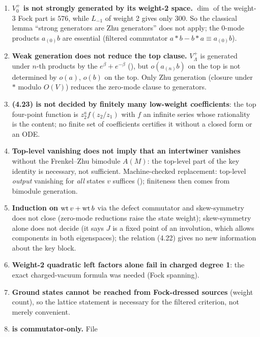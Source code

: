 \begin{enumerate}
  $\varphi$, or everything), and excluding the second case needs information about $A(V_0^+)$ beyond
  its image. What irreducibility does give is uniqueness of $\varphi$ up to scalar.
\item \textbf{$V_0^+$ is not strongly generated by its weight-2 space.} $\dim$ of the weight-3 Fock
  part is $576$, while $L_{-1}$ of weight 2 gives only $300$. So the classical lemma ``strong
  generators are Zhu generators'' does not apply; the 0-mode products $a_{(0)}b$ are essential
  (filtered commutator $a*b-b*a\equiv a_{(0)}b$).
\item \textbf{Weak generation does not reduce the top clause.} $V_\Lambda^+$ is generated under
  $n$-th products by the $e^\beta+e^{-\beta}$ (), but $o(a_{(n)}b)$ on the
  top is not determined by $o(a)$, $o(b)$ on the top. Only Zhu generation (closure under $*$ modulo
  $O(V)$) reduces the zero-mode clause to generators.
\item \textbf{(4.23) is not decided by finitely many low-weight coefficients}: the top four-point
  function is $z_2^af(z_2/z_1)$ with $f$ an infinite series whose rationality is the content; no
  finite set of coefficients certifies it without a closed form or an ODE.
\item \textbf{Top-level vanishing does not imply that an intertwiner vanishes} without the
  Frenkel--Zhu bimodule $A(M)$: the top-level part of the key identity is necessary, not
  sufficient. Machine-checked replacement: top-level \emph{output} vanishing for \emph{all} states
  $v$ suffices (); finiteness then comes from bimodule generation.
\item \textbf{Induction on $\operatorname{wt} v+\operatorname{wt} b$} via the defect commutator and skew-symmetry does not
  close (zero-mode reductions raise the state weight); skew-symmetry alone does not decide
   (it says $J$ is a fixed point of an involution, which allows components in both
  eigenspaces); the relation (4.22) gives no new information about the key block.
\item \textbf{Weight-2 quadratic left factors alone fail in charged degree 1}: the exact
  charged-vacuum formula  was needed (Fock spanning).
\item \textbf{Ground states cannot be reached from Fock-dressed sources} (weight count), so the
  lattice statement  is necessary for the filtered criterion, not merely
  convenient.
\item \textbf{ is commutator-only.} File

\end{enumerate}
